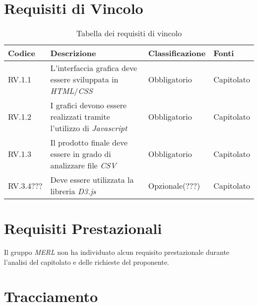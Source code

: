 \section{Requisiti di Vincolo}
\begin{table}[H]
  \centering
  \begin{tabular}{|p{}|p{6cm}|p{3cm}|p{2cm}|}
    \hline
    \rowcolor[HTML]{036400}
    {\color[HTML]{FFFFFF} \textbf{Codice}} & {\color[HTML]{FFFFFF} \textbf{Descrizione}} & {\color[HTML]{FFFFFF} \textbf{Classificazione}} & {\color[HTML]{FFFFFF} \textbf{Fonti}} \\ \hline
    \rowcolor[HTML]{EFEFEF}
    RV.1.1 & L'interfaccia grafica deve essere sviluppata in \textit{HTML}/\textit{CSS} & Obbligatorio & Capitolato \\ \hline
    \rowcolor[HTML]{C0C0C0}
    RV.1.2 & I grafici devono essere realizzati tramite l'utilizzo di \textit{Javascript} & Obbligatorio & Capitolato \\ \hline
    \rowcolor[HTML]{EFEFEF}
    RV.1.3 & Il prodotto finale deve essere in grado di analizzare file \textit{CSV} & Obbligatorio & Capitolato \\ \hline
    \rowcolor[HTML]{C0C0C0}
    RV.3.4??? & Deve essere utilizzata la libreria \textit{D3.js} & Opzionale(???) & Capitolato \\ \hline
  \end{tabular}
  \caption{Tabella dei requisiti di vincolo}
\end{table}

\section{Requisiti Prestazionali}
Il gruppo \textit{MERL} non ha individuato alcun requisito prestazionale durante l'analisi del capitolato e delle richieste del proponente.


\section{Tracciamento}

